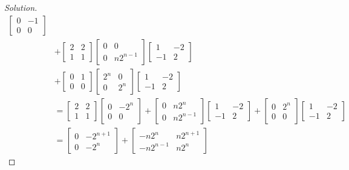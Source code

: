 \documentclass{article}
\begin{document}
\begin{enumerate}
\begin{proof}[Solution]
\begin{align*}
			\begin{bmatrix} 0 & -1 \\ 0 & 0 \end{bmatrix}\\
			&+ \begin{bmatrix} 2 & 2 \\ 1 & 1 \end{bmatrix}
			\begin{bmatrix} 0 & 0 \\ 0 & n2^{n-1}\end{bmatrix}
			\begin{bmatrix} 1 & -2 \\ -1 & 2 \end{bmatrix}\\
			&+ \begin{bmatrix} 0 & 1 \\ 0 & 0 \end{bmatrix}
			\begin{bmatrix}2^n & 0 \\ 0 & 2^n \end{bmatrix}
			\begin{bmatrix} 1 & -2 \\ -1 & 2 \end{bmatrix}\\
			&= \begin{bmatrix} 2 & 2 \\ 1 & 1 \end{bmatrix}
			\begin{bmatrix}0 & -2^n \\ 0 & 0 \end{bmatrix}
			+ \begin{bmatrix} 0 & n2^n \\ 0 & n2^{n-1}\end{bmatrix}
			\begin{bmatrix} 1 & -2 \\ -1 & 2 \end{bmatrix}
			+ \begin{bmatrix}0 & 2^n \\ 0 & 0 \end{bmatrix}
			\begin{bmatrix} 1 & -2 \\ -1 & 2 \end{bmatrix}\\
			&= \begin{bmatrix} 0 & -2^{n+1} \\ 0 & -2^n \end{bmatrix}
			+ \begin{bmatrix} -n2^n & n2^{n+1} \\ -n2^{n-1} & n2^n \end{bmatrix}

\end{align*}
\end{proof}
\end{enumerate}
\end{document}
